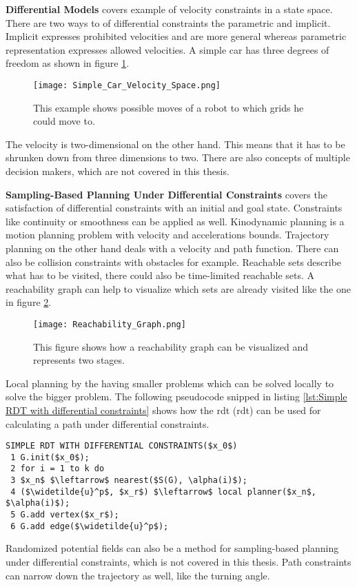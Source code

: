 \textbf{Differential Models} covers example of velocity constraints in a state space. There are two ways to of differential constraints the parametric and implicit. Implicit expresses prohibited velocities and are more general whereas parametric representation expresses allowed velocities. A simple car has three degrees of freedom as shown in figure \ref{fig:Simple Car Velocity Space}.
\begin{figure}[H]
    \centering
    \texttt{[image: Simple\_Car\_Velocity\_Space.png]}
    \caption{This example shows possible moves of a robot to which grids he could move to. \cite{planning_algorithms_steven_m_lavalle}}
    \label{fig:Simple Car Velocity Space}
\end{figure}
The velocity is two-dimensional on the other hand. This means that it has to be shrunken down from three dimensions to two. There are also concepts of multiple decision makers, which are not covered in this thesis.

\textbf{Sampling-Based Planning Under Differential Constraints} covers the satisfaction of differential constraints with an initial and goal state. Constraints like continuity or smoothness can be applied as well. Kinodynamic planning is a motion planning problem with velocity and accelerations bounds. Trajectory planning on the other hand deals with a velocity and path function. There can also be collision constraints with obstacles for example.
Reachable sets describe what has to be visited, there could also be time-limited reachable sets. A reachability graph can help to visualize which sets are already visited like the one in figure \ref{fig:Reachability Graph}.
\begin{figure}[H]
    \centering
    \texttt{[image: Reachability\_Graph.png]}
    \caption{This figure shows how a reachability graph can be visualized and represents two stages. \cite{planning_algorithms_steven_m_lavalle}}
    \label{fig:Reachability Graph}
\end{figure}
Local planning by the having smaller problems which can be solved locally to solve the bigger problem. The following pseudocode snipped in listing \ref{lst:Simple RDT with differential constraints} shows how the \acrlong{rdt} (\acrshort{rdt}) can be used for calculating a path under differential constraints.
\begin{lstlisting}[mathescape=true, caption={The local planning method computes $x_r$. A new vertex will be available: $x_r$. \cite{planning_algorithms_steven_m_lavalle}}, label={lst:Simple RDT with differential constraints}]
SIMPLE RDT WITH DIFFERENTIAL CONSTRAINTS($x_0$)
 1 G.init($x_0$);
 2 for i = 1 to k do
 3 $x_n$ $\leftarrow$ nearest($S(G), \alpha(i)$);
 4 ($\widetilde{u}^p$, $x_r$) $\leftarrow$ local planner($x_n$, $\alpha(i)$);
 5 G.add vertex($x_r$);
 6 G.add edge($\widetilde{u}^p$);
\end{lstlisting}
Randomized potential fields can also be a method for sampling-based planning under differential constraints, which is not covered in this thesis. Path constraints can narrow down the trajectory as well, like the turning angle. \cite{planning_algorithms_steven_m_lavalle}

